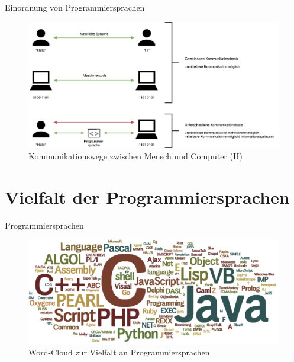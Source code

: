     \begin{frame}{Einordnung von Programmiersprachen}
        \begin{figure}
            \centering
            \includegraphics[width=\linewidth,height=0.5\textheight,keepaspectratio]{chapters/04_programming_languages/figures/communication_indirect.png}
            \caption{Kommunikationswege zwischen Mensch und Computer (II)}
        \end{figure}
    \end{frame}
    
\section{Vielfalt der Programmiersprachen}  

    \begin{frame}{Programmiersprachen}
        \begin{figure}
            \centering
            \includegraphics[width=\linewidth,height=0.5\textheight,keepaspectratio]{chapters/04_programming_languages/figures/languages.png}
            \caption{Word-Cloud zur Vielfalt an Programmiersprachen \cite{fig:programming_languages}}
        \end{figure}
    \end{frame}
    
